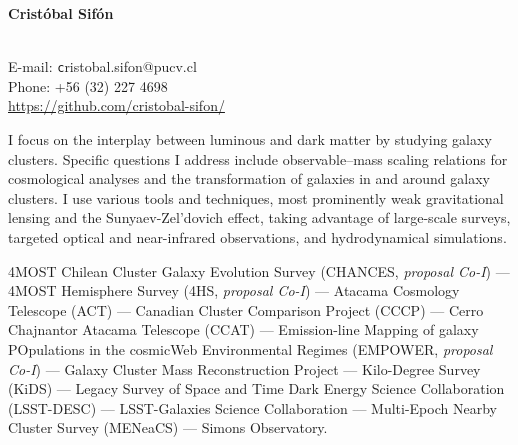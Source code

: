\documentclass[11pt]{article}
\begin{document}
\begin{minipage}[b]{0.50\linewidth}
\flushleft
\hspace{-0.7cm}
{\bf\huge Crist\'obal Sif\'on}\\\vspace{0.2cm}
\\
\end{minipage}
\begin{minipage}[b]{0.47\linewidth}
\flushright
{\large E-mail: {\texttt cristobal.sifon@pucv.cl}\\
        Phone: +56 (32) 227 4698\\
        \url{https://github.com/cristobal-sifon/}}
\end{minipage}
\vspace{0.4cm}
\hline




I focus on the interplay between luminous and dark matter by studying galaxy clusters. Specific questions I address include observable--mass scaling relations for cosmological analyses and the transformation of galaxies in and around galaxy clusters. I use various tools and techniques, most prominently weak gravitational lensing and the Sunyaev-Zel'dovich effect, taking advantage of large-scale surveys, targeted optical and near-infrared observations, and hydrodynamical simulations.

\vspace{0.5cm}
{
 4MOST Chilean Cluster Galaxy Evolution Survey (CHANCES, \textit{proposal Co-I}) ---
 4MOST Hemisphere Survey (4HS, \textit{proposal Co-I}) ---
 Atacama Cosmology Telescope (ACT) ---
 Canadian Cluster Comparison Project (CCCP) ---
 Cerro Chajnantor Atacama Telescope (CCAT) ---
 Emission-line Mapping of galaxy POpulations in the cosmicWeb Environmental Regimes (EMPOWER, \textit{proposal Co-I}) ---
 Galaxy Cluster Mass Reconstruction Project ---
 Kilo-Degree Survey (KiDS) ---
 Legacy Survey of Space and Time Dark Energy Science Collaboration (LSST-DESC) ---
 LSST-Galaxies Science Collaboration ---
 Multi-Epoch Nearby Cluster Survey (MENeaCS) ---
 Simons Observatory.
}
\end{document}
